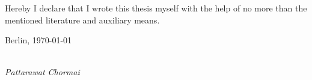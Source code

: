 \newpage

\thispagestyle{empty}

\begin{large}

\vspace*{6cm}

\noindent
Hereby I declare that I wrote this thesis myself with the help of no more than the mentioned literature and auxiliary means.
\vspace{2cm}

\noindent
Berlin, \today

\vspace{3cm}

\hspace*{7cm}%
\dotfill\\
\hspace*{8.5cm}%
\textit{Pattarawat Chormai}

\end{large}
